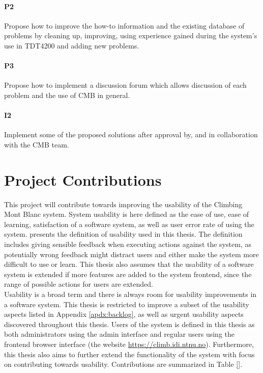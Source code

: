 \paragraph*{P2}  Propose how to improve the how-to information and the existing database of problems by cleaning up, improving, using experience gained during the system's use in TDT4200 \cite{TDT4200} and adding new problems.

\paragraph*{P3} Propose how to implement a discussion forum which allows discussion of each problem and the use of CMB in general.

\paragraph*{I2} Implement some of the proposed solutions after approval by, and in collaboration with the CMB team. \\

\section{Project Contributions}
\label{sec:cont}
This project will contribute towards improving the usability of the Climbing Mont Blanc system. System usability is here defined as the ease of use, ease of learning, satisfaction of a software system, as well as user error rate of using the system.  presents the definition of usability used in this thesis. The definition includes giving sensible feedback when executing actions against the system, as potentially wrong feedback might distract users and either make the system more difficult to use or learn. This thesis also assumes that the usability of a software system is extended if more features are added to the system frontend, since the range of possible actions for users are extended. \\

Usability is a broad term and there is always room for usability improvements in a software system. This thesis is restricted to improve a subset of the usability aspects listed in Appendix \ref{apdx:backlog}, as well as urgent usability aspects discovered throughout this thesis. Users of the system is defined in this thesis as both administrators using the admin interface and regular users using the frontend browser interface (the website \url{https://climb.idi.ntnu.no}). Furthermore, this thesis also aims to further extend the functionality of the system with focus on contributing towards usability. Contributions are summarized in Table \ref{}.

